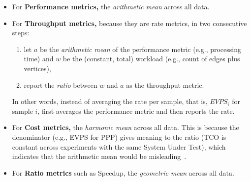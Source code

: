 \begin{itemize}
	\item For \textbf{Performance metrics,} the \emph{arithmetic mean} across all data.
	\item For \textbf{Throughput metrics,} because they are rate metrics, in two consecutive steps:
		\begin{enumerate}
			\item let $a$ be the \emph{arithmetic mean} of the performance metric (e.g., processing time) and $w$ be the (constant, total) workload (e.g., count of edges plus vertices),
			\item report the \emph{ratio} between $w$ and $a$ as the throughput metric.
		\end{enumerate}
 		In other words, instead of averaging the rate per sample, that is, $\textit{EVPS}_i$ for sample $i$, \toolname{} first averages the performance metric and then reports the rate. 
	\item For \textbf{Cost metrics,} the \emph{harmonic mean} across all data. This is because the denominator (e.g., EVPS for PPP) gives meaning to the ratio (TCO is constant across experiments with the same System Under Test), which indicates that the arithmetic mean would be misleading~\cite[S.3.1.1]{DBLP:conf/sc/HoeflerB15}.
	\item For \textbf{Ratio metrics} such as Speedup, the \emph{geometric mean} across all data.
\end{itemize}








